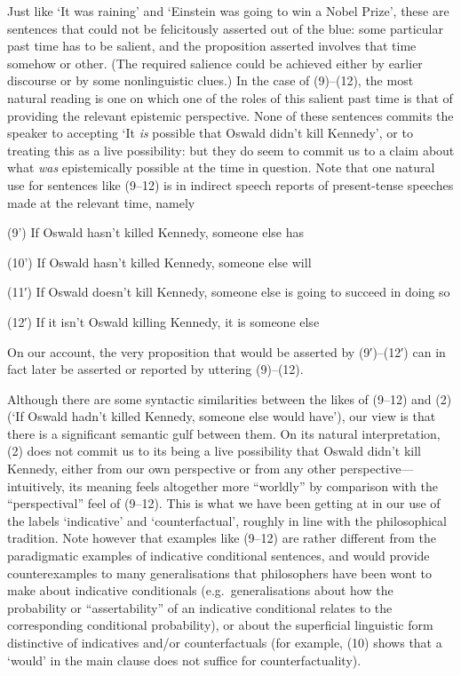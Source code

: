 Just like `It was raining' and `Einstein was going to win a Nobel
Prize', these are sentences that could not be felicitously asserted out
of the blue: some particular past time has to be salient, and the
proposition asserted involves that time somehow or other. (The required
salience could be achieved either by earlier discourse or by some
nonlinguistic clues.) In the case of (9)--(12), the most natural reading
is one on which one of the roles of this salient past time is that of
providing the relevant epistemic perspective. None of these sentences
commits the speaker to accepting `It \emph{is} possible that Oswald
didn't kill Kennedy', or to treating this as a live possibility: but
they do seem to commit us to a claim about what \emph{was} epistemically
possible at the time in question. Note that one natural use for
sentences like (9--12) is in indirect speech reports of present-tense
speeches made at the relevant time, namely

(9') If Oswald hasn't killed Kennedy, someone else has

(10') If Oswald hasn't killed Kennedy, someone else will

(11′) If Oswald doesn't kill Kennedy, someone else is going to succeed
in doing so

(12′) If it isn't Oswald killing Kennedy, it is someone else

On our account, the very proposition that would be asserted by
(9′)--(12′) can in fact later be asserted or reported by uttering
(9)--(12).

Although there are some syntactic similarities between the likes of
(9--12) and (2) (`If Oswald hadn't killed Kennedy, someone else would
have'), our view is that there is a significant semantic gulf between
them. On its natural interpretation, (2) does not commit us to its being
a live possibility that Oswald didn't kill Kennedy, either from our own
perspective or from any other perspective---intuitively, its meaning
feels altogether more ``worldly'' by comparison with the
``perspectival'' feel of (9--12). This is what we have been getting at
in our use of the labels `indicative' and `counterfactual', roughly in
line with the philosophical tradition. Note however that examples like
(9--12) are rather different from the paradigmatic examples of
indicative conditional sentences, and would provide counterexamples to
many generalisations that philosophers have been wont to make about
indicative conditionals (e.g.~generalisations about how the probability
or ``assertability'' of an indicative conditional relates to the
corresponding conditional probability), or about the superficial
linguistic form distinctive of indicatives and/or counterfactuals (for
example, (10) shows that a `would' in the main clause does not suffice
for counterfactuality).

